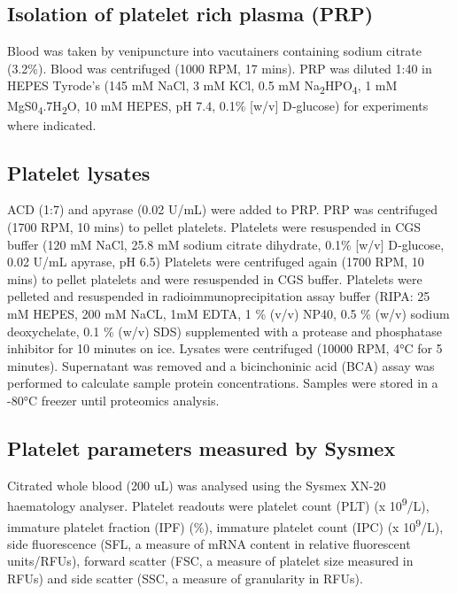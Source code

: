 \documentclass[11pt,twoside]{bristolthesis}
\begin{document}
\hypertarget{isolation-of-platelet-rich-plasma-prp}{%
\subsection{Isolation of platelet rich plasma (PRP)}\label{isolation-of-platelet-rich-plasma-prp}}

Blood was taken by venipuncture into vacutainers containing sodium citrate (3.2\%). Blood was centrifuged (1000 RPM, 17 mins). PRP was diluted 1:40 in HEPES Tyrode's (145 mM NaCl, 3 mM KCl, 0.5 mM Na\textsubscript{2}HPO\textsubscript{4}, 1 mM MgS0\textsubscript{4}.7H\textsubscript{2}O, 10 mM HEPES, pH 7.4, 0.1\% {[}w/v{]} D‐glucose) for experiments where indicated.

\hypertarget{platelet-lysates}{%
\subsection{Platelet lysates}\label{platelet-lysates}}

ACD (1:7) and apyrase (0.02 U/mL) were added to PRP. PRP was centrifuged (1700 RPM, 10 mins) to pellet platelets. Platelets were resuspended in CGS buffer (120 mM NaCl, 25.8 mM sodium citrate dihydrate, 0.1\% {[}w/v{]} D‐glucose, 0.02 U/mL apyrase, pH 6.5) Platelets were centrifuged again (1700 RPM, 10 mins) to pellet platelets and were resuspended in CGS buffer. Platelets were pelleted and resuspended in radioimmunoprecipitation assay buffer (RIPA: 25 mM HEPES, 200 mM NaCL, 1mM EDTA, 1 \% (v/v) NP40, 0.5 \% (w/v) sodium deoxychelate, 0.1 \% (w/v) SDS) supplemented with a protease and phosphatase inhibitor for 10 minutes on ice. Lysates were centrifuged (10000 RPM, 4°C for 5 minutes). Supernatant was removed and a bicinchoninic acid (BCA) assay was performed to calculate sample protein concentrations. Samples were stored in a -80°C freezer until proteomics analysis.

\hypertarget{platelet-parameters-measured-by-sysmex}{%
\subsection{Platelet parameters measured by Sysmex}\label{platelet-parameters-measured-by-sysmex}}

Citrated whole blood (200 uL) was analysed using the Sysmex XN-20 haematology analyser. Platelet readouts were platelet count (PLT) (x 10\textsuperscript{9}/L), immature platelet fraction (IPF) (\%), immature platelet count (IPC) (x 10\textsuperscript{9}/L), side fluorescence (SFL, a measure of mRNA content in relative fluorescent units/RFUs), forward scatter (FSC, a measure of platelet size measured in RFUs) and side scatter (SSC, a measure of granularity in RFUs).
\end{document}
